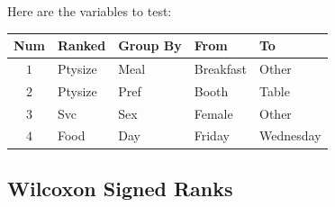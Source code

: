 Here are the variables to test:

\begin{center}
  \begin{tabular}{cllll}
    \hline 
    \textbf{Num} & \textbf{Ranked} & \textbf{Group By} & \textbf{From} & \textbf{To} \\ 
    \hline 
    $ 1 $ & Ptysize & Meal & Breakfast & Other \\ 
    $ 2 $ & Ptysize & Pref & Booth & Table \\ 
    $ 3 $ & Svc & Sex & Female & Other \\ 
    $ 4 $ & Food & Day & Friday & Wednesday \\ 
    \hline 
  \end{tabular} 
\end{center}

\subsection{Wilcoxon Signed Ranks}

